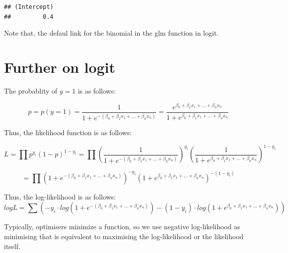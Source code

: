\documentclass[]{book}
\begin{document}
\begin{verbatim}
## (Intercept) 
##         0.4
\end{verbatim}

Note that, the defaul link for the binomial in the glm function in logit.

\hypertarget{further-on-logit}{%
\section{Further on logit}\label{further-on-logit}}

The probablity of \(y=1\) is as follows:

\[p=p(y=1)=\frac{1}{1+e^{-(\beta_0+\beta_1x_1+...+\beta_nx_n)}}=\frac{e^{\beta_0+\beta_1x_1+...+\beta_nx_n}}{1+e^{\beta_0+\beta_1x_1+...+\beta_nx_n}}\]

Thus, the likelihood function is as follows:

\[L=\prod p^{y_i}(1-p)^{1-y_i}=\prod (\frac{1}{1+e^{-(\beta_0+\beta_1x_1+...+\beta_nx_n)}})^{y_i}(\frac{1}{1+e^{\beta_0+\beta_1x_1+...+\beta_nx_n}})^{1-y_i}\]

\[=\prod (1+e^{-(\beta_0+\beta_1x_1+...+\beta_nx_n)})^{-y_i}(1+e^{\beta_0+\beta_1x_1+...+\beta_nx_n})^{-(1-y_i)}\]

Thus, the log-likelihood is as follows:
\[logL=\sum (-y_i \cdot log(1+e^{-(\beta_0+\beta_1x_1+...+\beta_nx_n)})-(1-y_i)\cdot log(1+e^{\beta_0+\beta_1x_1+...+\beta_nx_n}))\]

Typically, optimisers minimize a function, so we use negative log-likelihood as minimising that is equivalent to maximising the log-likelihood or the likelihood itself.
\end{document}

